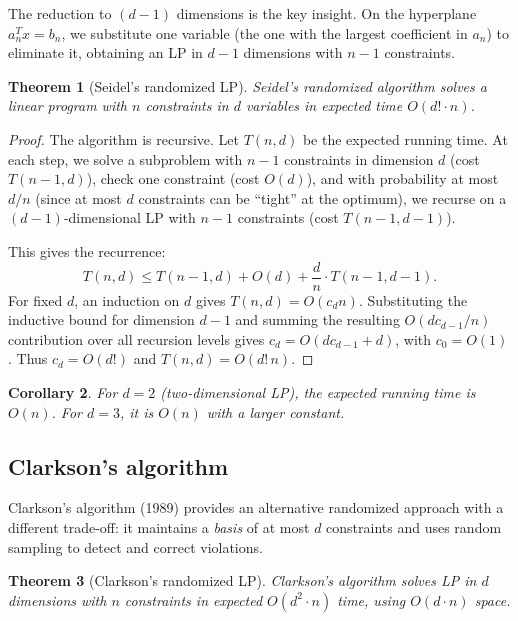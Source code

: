\documentclass[twoside,12pt]{book}
\theoremstyle{plain}
\newtheorem{theorem}{Theorem}[chapter]
\newtheorem{corollary}[theorem]{Corollary}
\theoremstyle{definition}
\theoremstyle{remark}
\begin{document}
The reduction to $(d-1)$ dimensions is the key insight. On the hyperplane $a_n^T x = b_n$, we substitute one variable (the one with the largest coefficient in $a_n$) to eliminate it, obtaining an LP in $d-1$ dimensions with $n-1$ constraints.

\begin{theorem}[Seidel's randomized LP]
\label{thm:seidel-lp}
Seidel's randomized algorithm solves a linear program with $n$ constraints in $d$ variables in expected time $O(d! \cdot n)$.
\end{theorem}

\begin{proof}
The algorithm is recursive. Let $T(n, d)$ be the expected running time. At each step, we solve a subproblem with $n-1$ constraints in dimension $d$ (cost $T(n-1, d)$), check one constraint (cost $O(d)$), and with probability at most $d/n$ (since at most $d$ constraints can be ``tight'' at the optimum), we recurse on a $(d-1)$-dimensional LP with $n-1$ constraints (cost $T(n-1, d-1)$).

This gives the recurrence:
\[
T(n, d) \leq T(n-1, d) + O(d) + \frac{d}{n} \cdot T(n-1, d-1).
\]
For fixed $d$, an induction on $d$ gives $T(n,d)=O(c_d n)$.
Substituting the inductive bound for dimension $d-1$ and summing the
resulting $O(d c_{d-1}/n)$ contribution over all recursion levels gives
$c_d=O(d c_{d-1}+d)$, with $c_0=O(1)$.  Thus $c_d=O(d!)$ and
$T(n,d)=O(d!\,n)$.
\end{proof}

\begin{corollary}
For $d = 2$ (two-dimensional LP), the expected running time is $O(n)$. For $d = 3$, it is $O(n)$ with a larger constant.
\end{corollary}

\subsection{Clarkson's algorithm}

Clarkson's algorithm (1989) provides an alternative randomized approach with a different trade-off: it maintains a \emph{basis} of at most $d$ constraints and uses random sampling to detect and correct violations.

\begin{theorem}[Clarkson's randomized LP]
\label{thm:clarkson-lp}
Clarkson's algorithm solves LP in $d$ dimensions with $n$ constraints in expected $O(d^2 \cdot n)$ time, using $O(d \cdot n)$ space.
\end{theorem}
\end{document}
